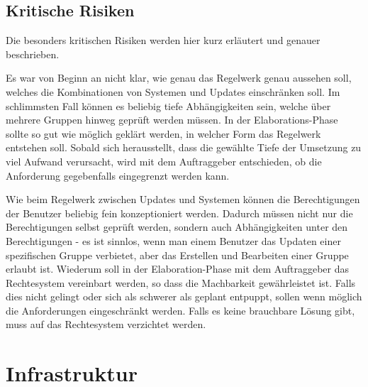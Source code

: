 \section{Kritische Risiken}

{Die besonders kritischen Risiken werden hier kurz erläutert und genauer beschrieben.}

{Es war von Beginn an nicht klar, wie genau das Regelwerk genau aussehen soll, welches die Kombinationen von Systemen und Updates einschränken soll. Im schlimmsten Fall können es beliebig tiefe Abhängigkeiten sein, welche über mehrere Gruppen hinweg geprüft werden müssen.}
{In der Elaborations-Phase sollte so gut wie möglich geklärt werden, in welcher Form das Regelwerk entstehen soll. Sobald sich herausstellt, dass die gewählte Tiefe der Umsetzung zu viel Aufwand verursacht, wird mit dem Auftraggeber entschieden, ob die Anforderung gegebenfalls eingegrenzt werden kann.}


{Wie beim Regelwerk zwischen Updates und Systemen können die Berechtigungen der Benutzer beliebig fein konzeptioniert werden. Dadurch müssen nicht nur die Berechtigungen selbst geprüft werden, sondern auch Abhängigkeiten unter den Berechtigungen - es ist sinnlos, wenn man einem Benutzer das Updaten einer spezifischen Gruppe verbietet, aber das Erstellen und Bearbeiten einer Gruppe erlaubt ist.}
{Wiederum soll in der Elaboration-Phase mit dem Auftraggeber das Rechtesystem vereinbart werden, so dass die Machbarkeit gewährleistet ist. Falls dies nicht gelingt oder sich als schwerer als geplant entpuppt, sollen wenn möglich die Anforderungen eingeschränkt werden. Falls es keine brauchbare Lösung gibt, muss auf das Rechtesystem verzichtet werden.}

\chapter{Infrastruktur}


